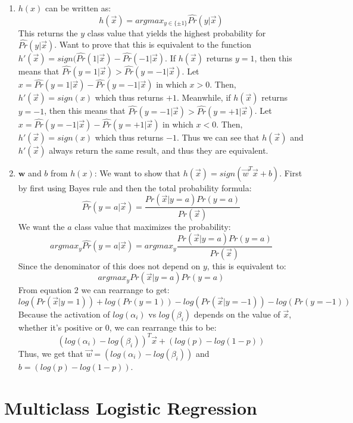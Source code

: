 \documentclass[english]{article}
\newcommand{\vw}{\mathbf{w}}
\begin{document}
\begin{enumerate}
\item $h(x)$ can be written as:
$$h(\vec{x}) = argmax_{y\in \{\pm 1\}}\hat{Pr}(y|\vec{x})$$
This returns the $y$ class value that yields the highest probability for $\hat{Pr}(y|\vec{x})$. Want to prove that this is equivalent to the function $h'(\vec{x}) = sign(\hat{Pr}(1|\vec{x}) - \hat{Pr}(-1|\vec{x})$. \newline\newline
If $h(\vec{x})$ returns $y=1$, then this means that $\hat{Pr}(y=1|\vec{x}) > \hat{Pr}(y = -1|\vec{x})$. Let $x = \hat{Pr}(y=1|\vec{x}) - \hat{Pr}(y = -1|\vec{x})$ in which $x > 0$. Then, $h'(\vec{x}) = sign(x)$ which thus returns $+1$. Meanwhile, if $h(\vec{x})$ returns $y=-1$, then this means that $\hat{Pr}(y=-1|\vec{x}) > \hat{Pr}(y = +1|\vec{x})$. Let $x = \hat{Pr}(y=-1|\vec{x}) - \hat{Pr}(y = +1|\vec{x})$ in which $x < 0$. Then, $h'(\vec{x}) = sign(x)$ which thus returns $-1$. Thus we can see that $h(\vec{x})$ and $h'(\vec{x})$ always return the same result, and thus they are equivalent. 

\item $\vw$ and $b$ from $h(x)$:
 We want to show that $h(\vec{x}) = sign(\vec{w}^T\vec{x} + b)$. First by first using Bayes rule and then the total probability formula: $$\hat{Pr}(y=a|\vec{x}) = \frac{Pr(\vec{x}|y=a)Pr(y=a)}{Pr(\vec{x})}$$
We want the $a$ class value that maximizes the probability:
$$argmax_{y} \hat{Pr}(y=a|\vec{x}) = argmax_{y}\frac{Pr(\vec{x}|y=a)Pr(y=a)}{Pr(\vec{x})}$$
Since the denominator of this does not depend on $y$, this is equivalent to: $$argmax_{y}Pr(\vec{x}|y=a)Pr(y=a)$$
From equation $2$ we can rearrange to get: 
$$log(Pr(\vec{x}|y=1)) + log(Pr(y=1)) - log(Pr(\vec{x}|y=-1)) - log(Pr(y=-1))$$
Because the activation of $log(\alpha_i)$ vs $log(\beta_i)$ depends on the value of $\vec{x}$, whether it's positive or $0$, we can rearrange this to be: 
$$(log(\alpha_i) - log(\beta_i))^T\vec{x} + (log(p) - log(1-p))$$
Thus, we get that $\vec{w} = (log(\alpha_i) - log(\beta_i))$ and $b = (log(p) - log(1-p))$.

\end{enumerate}

\section{Multiclass Logistic Regression}
\end{document}
